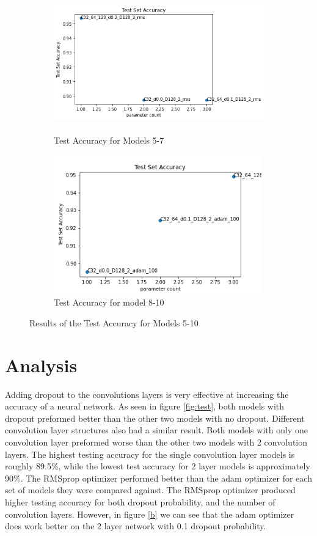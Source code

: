 \documentclass[twocolumn,letterpaper,10pt]{article}
\begin{document}
\begin{figure}[!h]
\begin{subfigure}{0.5\textwidth}
\includegraphics[width=0.9\linewidth, height=6cm]{rms_test_full.png} 
\caption{Test Accuracy for Models 5-7}
\label{fig:rmstest}
\end{subfigure}
\begin{subfigure}{0.5\textwidth}
\includegraphics[width=0.9\linewidth, height=6cm]{test adam.png}
\caption{Test Accuracy for model 8-10}
\label{fig:adamtest}
\end{subfigure}

\caption{Results of the Test Accuracy for Models 5-10}
\label{fig:b}
\end{figure}

\section{Analysis}
\label{analysis}
Adding dropout to the convolutions layers is very effective at increasing the accuracy of a neural network. As seen in figure \ref{fig:test}, both models with dropout preformed better than the other two models with no dropout. Different convolution layer structures also had a similar result. Both models with only one convolution layer preformed worse than the other two models with 2 convolution layers. The highest testing accuracy for the single convolution layer models is roughly 89.5\%, while the lowest test accuracy for 2 layer models is approximately 90\%. The RMSprop optimizer performed better than the adam optimizer for each set of models they were compared against. The RMSprop optimizer produced higher testing accuracy for both dropout probability, and the number of convolution layers. However, in figure \ref{b} we can see that the adam optimizer does work better on the 2 layer network with 0.1 dropout probability.\\
\end{document}
